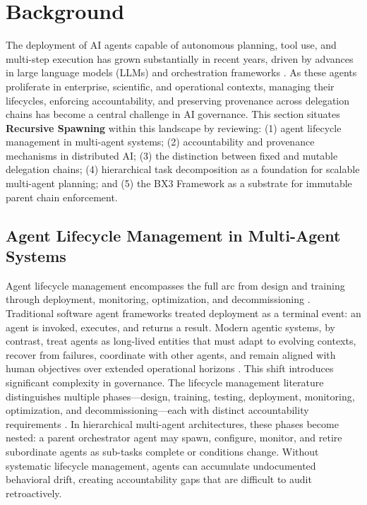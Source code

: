 \section{Background}
\label{sec:background}

The deployment of AI agents capable of autonomous planning, tool use, and multi-step execution has grown substantially in recent years, driven by advances in large language models (LLMs) and orchestration frameworks \cite{maeda_etal_2024_structuredagent, wu_etal_2024_magicscript}. As these agents proliferate in enterprise, scientific, and operational contexts, managing their lifecycles, enforcing accountability, and preserving provenance across delegation chains has become a central challenge in AI governance. This section situates \textbf{Recursive Spawning} within this landscape by reviewing: (1) agent lifecycle management in multi-agent systems; (2) accountability and provenance mechanisms in distributed AI; (3) the distinction between fixed and mutable delegation chains; (4) hierarchical task decomposition as a foundation for scalable multi-agent planning; and (5) the BX3 Framework as a substrate for immutable parent chain enforcement.

\subsection{Agent Lifecycle Management in Multi-Agent Systems}
\label{sec:background_lifecycle}

Agent lifecycle management encompasses the full arc from design and training through deployment, monitoring, optimization, and decommissioning \cite{onereach_2026_agent_lifecycle}. Traditional software agent frameworks treated deployment as a terminal event: an agent is invoked, executes, and returns a result. Modern agentic systems, by contrast, treat agents as long-lived entities that must adapt to evolving contexts, recover from failures, coordinate with other agents, and remain aligned with human objectives over extended operational horizons \cite{weng_2025_selfmodification, beebe_2026_bx3_grant}. This shift introduces significant complexity in governance. The lifecycle management literature distinguishes multiple phases---design, training, testing, deployment, monitoring, optimization, and decommissioning---each with distinct accountability requirements \cite{onereach_2026_agent_lifecycle, SPIE_2026_assurance}. In hierarchical multi-agent architectures, these phases become nested: a parent orchestrator agent may spawn, configure, monitor, and retire subordinate agents as sub-tasks complete or conditions change. Without systematic lifecycle management, agents can accumulate undocumented behavioral drift, creating accountability gaps that are difficult to audit retroactively.

